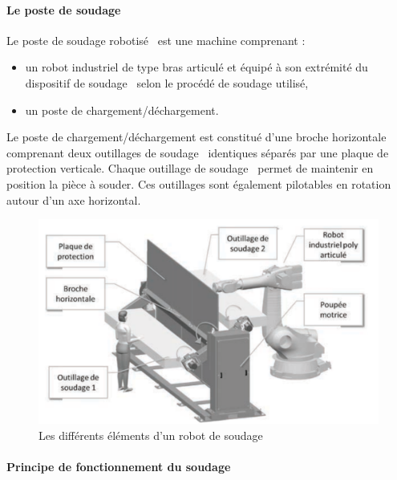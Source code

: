 \paragraph{Le poste de soudage}

Le \og poste de soudage robotisé \fg\ est une machine comprenant :
\begin{itemize}
 \item un robot industriel de type bras articulé et équipé à son extrémité du \og dispositif de soudage \fg\ selon le procédé de soudage utilisé,
 \item un poste de chargement/déchargement.
\end{itemize}

Le poste de chargement/déchargement est constitué d’une broche horizontale comprenant deux \og outillages de soudage \fg\ identiques séparés par une plaque de protection verticale. Chaque \og outillage de soudage \fg\ permet de maintenir en position la pièce à souder. Ces outillages sont également pilotables en rotation autour d’un axe
horizontal.

\begin{figure}[!h]
\centering\includegraphics[width=0.7\linewidth]{img/fig02}
 \caption{Les différents éléments d'un robot de soudage}
 \label{img02}
\end{figure}

\vspace{-1cm}

\paragraph{Principe de fonctionnement du soudage}

